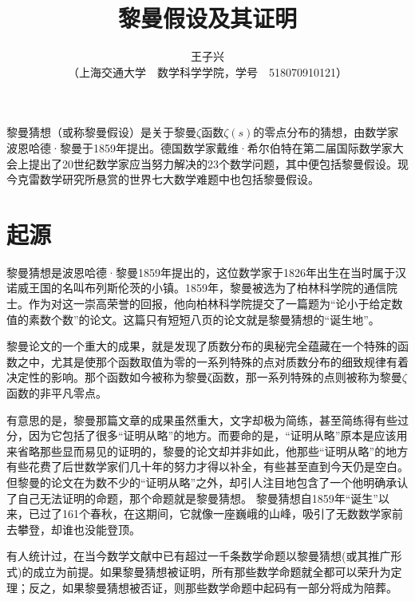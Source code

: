 \documentclass[10.5pt]{Template}
\newcommand\mycolorRed[1]{{\color{red}#1}}
\begin{document}
\title{
 \erhao\hei 黎曼假设及其证明 
}

\author{
\sihao\kai 王子兴 \\[0.1cm] 
\liuhao （上海交通大学~~数学科学学院，学号~~518070910121） \\ }

\date{}  

  \maketitle
\begin{CAbstractJBUAA}
黎曼猜想（或称黎曼假设）是关于黎曼$\zeta$函数$\zeta(s)$的零点分布的猜想，由数学家波恩哈德·黎曼于1859年提出。德国数学家戴维·希尔伯特在第二届国际数学家大会上提出了20世纪数学家应当努力解决的23个数学问题，其中便包括黎曼假设。现今克雷数学研究所悬赏的世界七大数学难题中也包括黎曼假设。
\end{CAbstractJBUAA}

\wuhao 

\section{起源}
\mycolorRed{黎曼猜想}是波恩哈德·黎曼1859年提出的，这位数学家于1826年出生在当时属于汉诺威王国的名叫布列斯伦茨的小镇。1859年，黎曼被选为了柏林科学院的通信院士。作为对这一崇高荣誉的回报，他向柏林科学院提交了一篇题为“论小于给定数值的素数个数”的论文。这篇只有短短八页的论文就是黎曼猜想的“诞生地”。

黎曼论文的一个重大的成果，就是发现了质数分布的奥秘完全蕴藏在一个特殊的函数之中，尤其是使那个函数取值为零的一系列特殊的点对质数分布的细致规律有着决定性的影响。那个函数如今被称为黎曼ζ函数，那一系列特殊的点则被称为黎曼$\zeta$函数的非平凡零点。

有意思的是，黎曼那篇文章的成果虽然重大，文字却极为简练，甚至简练得有些过分，因为它包括了很多“证明从略”的地方。而要命的是，“证明从略”原本是应该用来省略那些显而易见的证明的，黎曼的论文却并非如此，他那些“证明从略”的地方有些花费了后世数学家们几十年的努力才得以补全，有些甚至直到今天仍是空白。但黎曼的论文在为数不少的“证明从略”之外，却引人注目地包含了一个他明确承认了自己无法证明的命题，那个命题就是黎曼猜想。 黎曼猜想自1859年“诞生”以来，已过了161个春秋，在这期间，它就像一座巍峨的山峰，吸引了无数数学家前去攀登，却谁也没能登顶。

有人统计过，在当今数学文献中已有超过一千条数学命题以黎曼猜想(或其推广形式)的成立为前提。如果黎曼猜想被证明，所有那些数学命题就全都可以荣升为定理；反之，如果黎曼猜想被否证，则那些数学命题中起码有一部分将成为陪葬。
\end{document}
